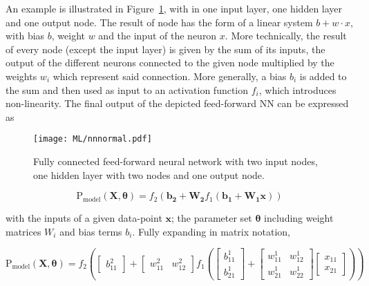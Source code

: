 An example is illustrated in Figure~\ref{ML:normalNN}, with in one input layer, one hidden layer and one output node. The result of node has the form of a linear system $b+w\cdot x$, with bias $b$, weight $w$ and the input of the neuron $x$. More technically, the result of every node (except the input layer) is given by the sum of its inputs, the output of the different neurons connected to the given node multiplied by the weights $w_i$ which represent said connection. More generally, a bias $b_i$ is added to the sum and then used as input to an activation function $f_i$, which introduces non-linearity. The final output of the depicted feed-forward NN can be expressed as

\begin{figure}[htbp]
    \RawFloats
    \begin{center}
    \texttt{[image: ML/nnnormal.pdf]}
    \caption{
        Fully connected feed-forward neural network with two input nodes, one hidden layer with two nodes and one output node.
    }
    \label{ML:normalNN}
    \end{center}
\end{figure}

\begin{equation}
    \text{P}_\text{model}(\mathbf{X},\boldsymbol{\theta}) = f_2(\mathbf{b_2}+\mathbf{W_2}f_1(\mathbf{b_1}+\mathbf{W_1}\mathbf{x}))
\end{equation}

with the inputs of a given data-point $\mathbf{x}$; the parameter set $\boldsymbol{\theta}$ including weight matrices $W_i$ and bias terms $b_i$. Fully expanding in matrix notation,

\begin{equation}
    \text{P}_\text{model}(\mathbf{X},\boldsymbol{\theta}) = f_2\left( \begin{bmatrix} b_{11}^2 \end{bmatrix}+ \begin{bmatrix} w_{11}^2 & w_{12}^2\end{bmatrix}f_1\left( \begin{bmatrix} b_{11}^1 \\  
                                                            b_{21}^1  \end{bmatrix}+ \begin{bmatrix} 
    w_{11}^1 & w_{12}^1 \\ 
    w_{21}^1 & w_{22}^1\end{bmatrix} \begin{bmatrix}
        x_{11}\\
        x_{21}
    \end{bmatrix} \right) \right)
\end{equation}

